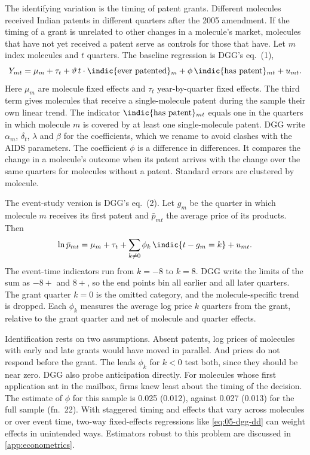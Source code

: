 The identifying variation is the timing of patent grants. Different molecules received Indian patents in different
quarters after the 2005 amendment. If the timing of a grant is unrelated to other changes in a molecule's market,
molecules that have not yet received a patent serve as controls for those that have. Let $m$ index molecules and $t$
quarters. The baseline regression is DGG's eq.~(1),
\begin{equation}\label{eq:05-dgg-dd}
Y_{mt} = \mu_m + \tau_t + \vartheta\, t\cdot\indic\{\text{ever patented}\}_m
  + \phi\,\indic\{\text{has patent}\}_{mt} + u_{mt}.
\end{equation}
Here $\mu_m$ are molecule fixed effects and $\tau_t$ year-by-quarter fixed effects. The third term gives molecules that
receive a single-molecule patent during the sample their own linear trend. The indicator
$\indic\{\text{has patent}\}_{mt}$ equals one in the quarters in which molecule $m$ is covered by at least one
single-molecule patent. DGG write $\alpha_m$, $\delta_t$, $\lambda$ and $\beta$ for the coefficients, which we rename to
avoid clashes with the AIDS parameters. The coefficient $\phi$ is a difference in differences. It compares the change
in a molecule's outcome when its patent arrives with the change over the same quarters for molecules without a patent.
Standard errors are clustered by molecule.

The event-study version is DGG's eq.~(2). Let $g_m$ be the quarter in which molecule $m$ receives its first patent and
$\bar p_{mt}$ the average price of its products. Then
\begin{equation}\label{eq:05-dgg}
\ln\bar p_{mt} = \mu_m + \tau_t + \sum_{k\neq 0}\phi_k\,\indic\{t - g_m = k\} + u_{mt}.
\end{equation}
The event-time indicators run from $k = -8$ to $k = 8$. DGG write the limits of the sum as $-8+$ and $8+$, so the
end points bin all earlier and all later quarters. The grant quarter $k = 0$ is the omitted category, and the
molecule-specific trend is dropped. Each $\phi_k$ measures the average log price $k$ quarters from the grant, relative
to the grant quarter and net of molecule and quarter effects.

Identification rests on two assumptions. Absent patents, log prices of molecules with early and late grants would
have moved in parallel. And prices do not respond before the grant. The leads $\phi_k$ for $k < 0$ test both, since
they should be near zero. DGG also probe anticipation directly. For molecules whose first application sat in the
mailbox, firms knew least about the timing of the decision. The estimate of $\phi$ for this sample is 0.025 (0.012),
against 0.027 (0.013) for the full sample (fn.~22). With staggered timing and effects that vary across molecules or
over event time, two-way fixed-effects regressions like \eqref{eq:05-dgg-dd} can weight effects in unintended ways.
Estimators robust to this problem are discussed in \cref{app:econometrics}.

